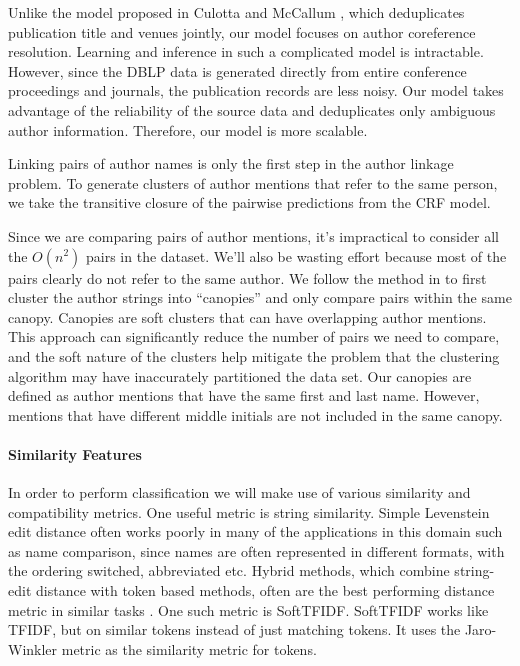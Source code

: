\documentclass[twocolumn,letterpaper]{article}
\begin{document}
Unlike the model proposed in Culotta and McCallum
\cite{Culotta05aconditional}, which deduplicates publication title and
venues jointly, our model focuses on author coreference resolution.
Learning and inference in such a complicated model is intractable.
However, since the DBLP data is generated directly from entire
conference proceedings and journals, the publication records are less
noisy.  Our model takes advantage of the reliability of the source
data and deduplicates only ambiguous author information.  Therefore,
our model is more scalable.

Linking pairs of author names is only the first step in the author
linkage problem.  To generate clusters of author mentions that refer
to the same person, we take the transitive closure of the pairwise
predictions from the CRF model.

Since we are comparing pairs of author mentions, it's impractical to
consider all the $O(n^2)$ pairs in the dataset.  We'll also be wasting
effort because most of the pairs clearly do not refer to the same
author.  We follow the method in \cite{McCallum00} to first cluster
the author strings into ``canopies'' and only compare pairs within the
same canopy.  Canopies are soft clusters that can have overlapping
author mentions.  This approach can significantly reduce the number of
pairs we need to compare, and the soft nature of the clusters help
mitigate the problem that the clustering algorithm may have
inaccurately partitioned the data set.  Our canopies are defined as
author mentions that have the same first and last name.  However,
mentions that have different middle initials are not included in the
same canopy. 


\paragraph{Similarity Features} %
\label{par:similarity_features}
In order to perform classification we will make use of various similarity and compatibility metrics. One useful metric is string similarity. Simple Levenstein edit distance often works poorly in many of the applications in this domain such as name comparison, since names are often represented in different formats, with the ordering switched, abbreviated etc. Hybrid methods, which combine string-edit distance with token based methods, often are the best performing distance metric in similar tasks \cite{cohen2003comparison}. One such metric is SoftTFIDF. SoftTFIDF works like TFIDF, but on similar tokens instead of just matching tokens. It uses the Jaro-Winkler metric as the similarity metric for tokens. 
\end{document}
